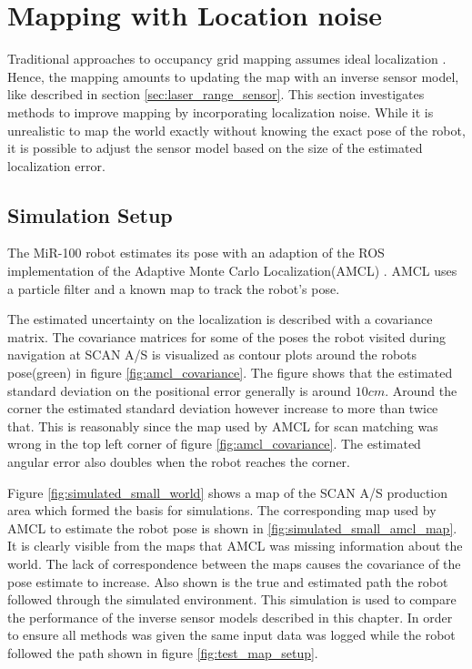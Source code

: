\section{Mapping with Location noise}
\label{sec:mapping_with_location_noise}

Traditional approaches to occupancy grid mapping assumes ideal localization \cite{probRob}. 
Hence, the mapping amounts to updating the map with an inverse sensor model, like described in section \vref{sec:laser_range_sensor}.
This section investigates methods to improve mapping by incorporating localization noise.
While it is unrealistic to map the world exactly without knowing the exact pose of the robot, it is possible to adjust the sensor model based on the size of the estimated localization error.

\subsection{Simulation Setup}
The MiR-100 robot estimates its pose with an adaption of the ROS implementation \cite{ros_amcl} of the Adaptive Monte Carlo Localization(AMCL) \cite{Thrun200199}. AMCL uses a particle filter and a known map to track the robot's pose. 

The estimated uncertainty on the localization is described with a covariance matrix. 
The covariance matrices for some of the poses the robot visited during navigation at SCAN A/S is visualized as contour plots around the robots pose(green) in figure \vref{fig:amcl_covariance}. 
The figure shows that the estimated standard deviation on the positional error generally is around $10cm$. Around the corner the estimated standard deviation however increase to more than twice that. This is reasonably since the map used by AMCL for scan matching was wrong in the top left corner of figure \vref{fig:amcl_covariance}. The estimated angular error also doubles when the robot reaches the corner.

Figure \vref{fig:simulated_small_world} shows a map of the SCAN A/S production area which formed the basis for simulations. The corresponding map used by AMCL to estimate the robot pose is shown in \vref{fig:simulated_small_amcl_map}.
It is clearly visible from the maps that AMCL was missing information about the world. The lack of correspondence between the maps causes the covariance of the pose estimate to increase. 
Also shown is the true and estimated path the robot followed through the simulated environment. This simulation is used to compare the performance of the inverse sensor models described in this chapter. In order to ensure all methods was given the same input data was logged while the robot followed the path shown in figure \vref{fig:test_map_setup}.

